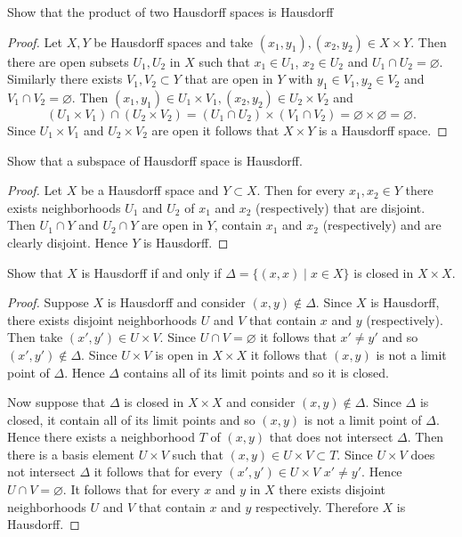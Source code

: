 \begin{ex}{17.11}
    Show that the product of two Hausdorff spaces is Hausdorff
\end{ex}
\begin{proof}
    Let $X,Y$ be Hausdorff spaces and take $(x_1,y_1),(x_2, y_2)\in X\times Y$.
    Then there are open subsets $U_1,U_2$ in $X$ such that $x_1\in U_1$, $x_2\in U_2$ and $U_1\cap U_2=\varnothing$.
    Similarly there exists $V_1,V_2\subset Y$ that are open in $Y$ with $y_1\in V_1, y_2\in V_2$ and $V_1\cap V_2=\varnothing$.
    Then $(x_1,y_1)\in U_1\times V_1, (x_2,y_2)\in U_2\times V_2$ and
    $$\left(U_1\times V_1\right)\cap\left(U_2\times V_2\right)=\left(U_1\cap U_2\right)\times\left(V_1\cap V_2\right)=\varnothing\times\varnothing=\varnothing.$$
    Since $U_1\times V_1$ and $U_2\times V_2$ are open it follows that $X\times Y$ is a Hausdorff space.
\end{proof}

\begin{ex}{17.12}
    Show that a subspace of Hausdorff space is Hausdorff.
\end{ex}
\begin{proof}
    Let $X$ be a Hausdorff space and $Y\subset X$. Then for every $x_1, x_2\in Y$ there exists neighborhoods $U_1$ and $U_2$ of $x_1$ and $x_2$ (respectively) that are disjoint.
    Then $U_1\cap Y$ and $U_2\cap Y$ are open in $Y$, contain $x_1$ and $x_2$ (respectively) and are clearly disjoint. Hence $Y$ is Hausdorff.
\end{proof}

\begin{ex}{17.13}
    Show that $X$ is Hausdorff if and only if $\Delta = \{(x,x)\mid x\in X\}$ is closed in $X\times X$.
\end{ex}
\begin{proof}
    Suppose $X$ is Hausdorff and consider $(x,y)\not\in\Delta$. Since $X$ is Hausdorff, there exists disjoint neighborhoods $U$ and $V$ that contain $x$ and $y$ (respectively).
    Then take $(x', y')\in U\times V$. Since $U\cap V=\varnothing$ it follows that $x'\neq y'$ and so $(x',y')\not\in\Delta$.
    Since $U\times V$ is open in $X\times X$ it follows that $(x,y)$ is not a limit point of $\Delta$. Hence $\Delta$ contains all of its limit points and so it is closed.

    Now suppose that $\Delta$ is closed in $X\times X$ and consider $(x,y)\not\in\Delta$. Since $\Delta$ is closed, it contain all of its limit points and so $(x,y)$ is not a limit point of $\Delta$. 
    Hence there exists a neighborhood $T$ of $(x,y)$ that does not intersect $\Delta$. Then there is a basis element $U\times V$ such that $(x,y)\in U\times V\subset T$.
    Since $U\times V$ does not intersect $\Delta$ it follows that for every $(x', y')\in U\times V$ $x'\neq y'$. Hence $U\cap V=\varnothing$. 
    It follows that for every $x$ and $y$ in $X$ there exists disjoint neighborhoods $U$ and $V$ that contain $x$ and $y$ respectively. Therefore $X$ is Hausdorff.
\end{proof}

